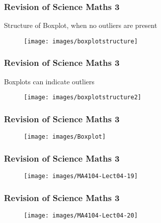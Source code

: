 \documentclass{beamer}
\begin{document}
		\begin{frame}
			\frametitle{Revision of Science Maths 3}
\Large
Structure of Boxplot, when no outliers are present
\begin{figure}
\centering
\texttt{[image: images/boxplotstructure]}
\end{figure}
		\end{frame}
		\begin{frame}
			\frametitle{Revision of Science Maths 3}
\Large
Boxplots can indicate outliers
			\begin{figure}
				\centering
				\texttt{[image: images/boxplotstructure2]}
			\end{figure}
		\end{frame}
				\begin{frame}
					\frametitle{Revision of Science Maths 3}
\begin{figure}
\centering
\texttt{[image: images/Boxplot]}
\end{figure}
				\end{frame}	
	\begin{frame}
		\frametitle{Revision of Science Maths 3}
		\begin{figure}
			\centering
			\texttt{[image: images/MA4104-Lect04-19]}
			
		\end{figure}
	\end{frame}
	\begin{frame}
		\frametitle{Revision of Science Maths 3}
		\begin{figure}
			\centering
			\texttt{[image: images/MA4104-Lect04-20]}
			
		\end{figure}
	\end{frame}
	
	
	
\end{document}
